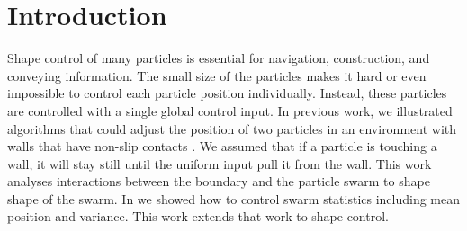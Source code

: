 \section{Introduction}\label{sec:Intro}



Shape control of many particles is essential for navigation, construction, and conveying information. 
 The small size of the particles makes it hard or even impossible to control each particle position individually. Instead, these particles are controlled with a single global control input.
 In previous work, we illustrated algorithms that could adjust the position of two particles in an environment with walls that have non-slip contacts \cite{shahrokhi2017}. We assumed that if a particle is touching a wall, it will stay still until the uniform input pull it from the wall. This work analyses interactions between the boundary and the particle swarm to shape shape of the swarm. In \cite{shahrokhi2018TRO} we showed how to control swarm statistics including mean position and variance. This work extends that work to shape control.



